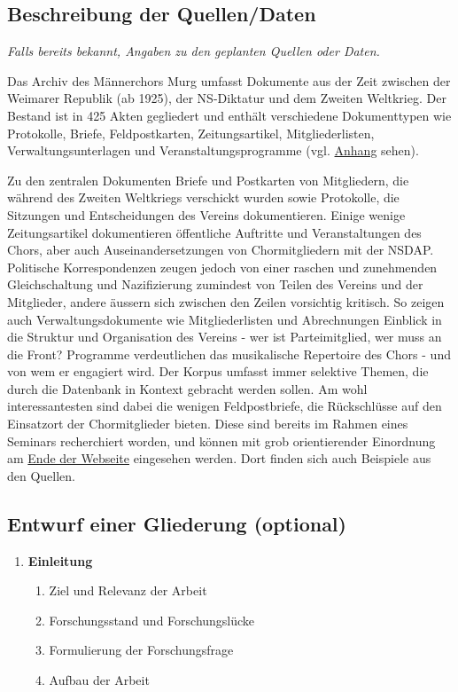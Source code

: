 \documentclass[12pt, a4paper, ngerman, bidi=default]{article}
\begin{document}
\begin{spacing}{1.5}
\subsection {\textbf{Beschreibung der Quellen/Daten}}
\textit{Falls bereits bekannt, Angaben zu den geplanten Quellen oder Daten.}

Das Archiv des Männerchors Murg umfasst Dokumente aus der Zeit zwischen der Weimarer Republik (ab 1925), der NS-Diktatur und dem Zweiten Weltkrieg. Der Bestand ist in 425 Akten gegliedert und enthält verschiedene Dokumenttypen wie Protokolle, Briefe, Feldpostkarten, Zeitungsartikel, Mitgliederlisten, Verwaltungsunterlagen und Veranstaltungsprogramme (vgl. \hyperref[sec:Anhang Datenbankstruktur]{Anhang} sehen). 

Zu den zentralen Dokumenten Briefe und Postkarten von Mitgliedern, die während des Zweiten Weltkriegs verschickt wurden sowie Protokolle, die Sitzungen und Entscheidungen des Vereins dokumentieren. Einige wenige Zeitungsartikel dokumentieren öffentliche Auftritte und Veranstaltungen des Chors, aber auch Auseinandersetzungen von Chormitgliedern mit der NSDAP. Politische Korrespondenzen zeugen jedoch von einer raschen und zunehmenden Gleichschaltung und Nazifizierung zumindest von Teilen des Vereins und der Mitglieder, andere äussern sich zwischen den Zeilen vorsichtig kritisch.
So zeigen auch Verwaltungsdokumente wie Mitgliederlisten und Abrechnungen Einblick in die Struktur und Organisation des Vereins - wer ist Parteimitglied, wer muss an die Front? Programme verdeutlichen das musikalische Repertoire des Chors -  und von wem er engagiert wird.
Der Korpus umfasst immer selektive Themen, die durch die Datenbank in Kontext gebracht werden sollen. Am wohl interessantesten sind dabei die wenigen Feldpostbriefe, die Rückschlüsse auf den Einsatzort der Chormitglieder bieten. Diese sind bereits im Rahmen eines Seminars recherchiert worden, und können mit grob orientierender Einordnung am  \href{https://storymaps.arcgis.com/stories/ec8a4b675cac476380df910304a47547}{Ende der Webseite} eingesehen werden. Dort finden sich auch Beispiele aus den Quellen. 

\subsection{\textbf{Entwurf einer Gliederung (optional)}}
\begin{enumerate}
    \item \textbf{Einleitung}
    \begin{enumerate}
        \item \small Ziel und Relevanz der Arbeit
        \item \small Forschungsstand und Forschungslücke
        \item \small Formulierung der Forschungsfrage
        \item \small Aufbau der Arbeit
    \end{enumerate}
    

\end{enumerate}
\end{spacing}
\end{document}
